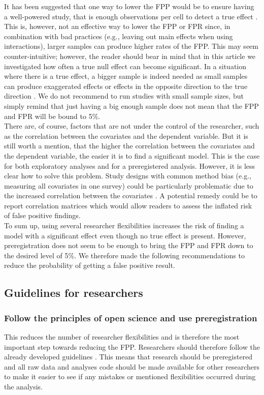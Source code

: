 It has been suggested that one way to lower the FPP would be to ensure having a well-powered study, that is enough observations per cell to detect a true effect \citep{Simmons2011, simmons2018}. This is, however, not an effective way to lower the FPP or FPR since, in combination with bad practices (e.g., leaving out main effects when using interactions), larger samples can produce higher rates of the FPP. This may seem counter-intuitive; however, the reader should bear in mind that in this article we investigated how often a true null effect can become significant. In a situation where there is a true effect, a bigger sample is indeed needed as small samples can produce exaggerated effects or effects in the opposite direction to the true direction \citep{gelman2014beyond}. We do not recommend to run studies with small sample sizes, but simply remind that just having a big enough sample does not mean that the FPP and FPR will be bound to 5\%.\\

There are, of course, factors that are not under the control of the researcher, such as the correlation between the covariates and the dependent variable. But it is still worth a mention, that the higher the correlation between the covariates and the dependent variable, the easier it is to find a significant model. This is the case for both exploratory analyses and for a preregistered analysis. However, it is less clear how to solve this problem. Study designs with common method bias (e.g., measuring all covariates in one survey) could be particularly problematic due to  the increased correlation between the covariates \citep{podsakoff2003}. A potential remedy could be to report correlation matrices which would allow readers to assess the inflated risk of false positive findings.  \\ 

To sum up, using several researcher flexibilities increases the risk of finding a model with a significant effect even though no true effect is present. However, preregistration does not seem to be enough to bring the FPP and FPR down to the desired level of 5\%. We therefore made the following recommendations to reduce the probability of getting a false positive result. 

\subsection{Guidelines for researchers}

\subsubsection{Follow the principles of open science and use preregistration}
This reduces the number of researcher flexibilities and is therefore the most important step towards reducing the FPP. Researchers should therefore follow the already developed guidelines \citep{Nosek2015}. This means that research should be preregistered and all raw data and analyses code should be made available for other researchers to make it easier to see if any mistakes or mentioned flexibilities occurred during the analysis. 
